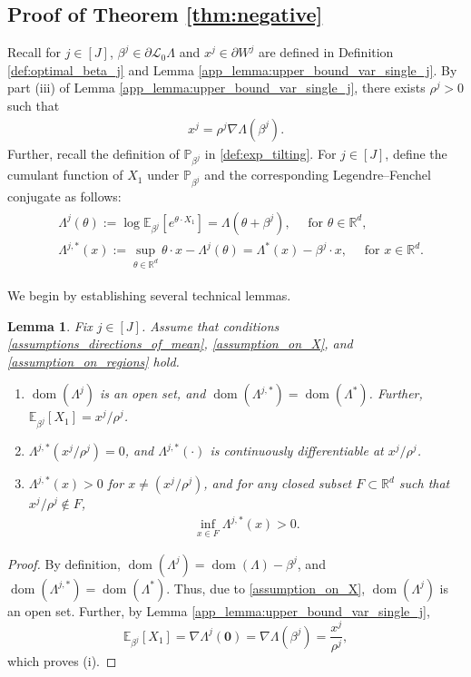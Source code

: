 \documentclass[aap,preprint]{imsart}
\newcommand{\Pro}{{\mathbb{P}}}
\newcommand{\Exp}{{\mathbb{E}}}
\newcommand{\bR}{{\mathbb{R}}}
\theoremstyle{plain}
\newtheorem{lemma}[theorem]{Lemma}
\theoremstyle{definition}
\begin{document}
\begin{appendix}
\subsection{Proof of Theorem \ref{thm:negative}}\label{app:neg_result}
Recall for $j \in [J]$, $\beta^j \in \partial \mathcal{L}_0 \Lambda$ and $x^j \in \partial W^j$ are defined in Definition \eqref{def:optimal_beta_j} and Lemma \ref{app_lemma:upper_bound_var_single_j}. By part (iii) of Lemma \ref{app_lemma:upper_bound_var_single_j}, there exists $\rho^j > 0$ such that 
\begin{align*}
    x^j = \rho^j \nabla \Lambda(\beta^j).
\end{align*}
Further, recall the definition of 
  $\Pro_{\beta^j}$ in \eqref{def:exp_tilting}. For $j \in [J]$, define the cumulant function of $X_1$ under $\Pro_{\beta^j}$ and the corresponding Legendre--Fenchel conjugate as follows:
\begin{align*}%
\begin{split}
        &\Lambda^j(\theta) := \log\Exp_{\beta^j}[e^{\theta \cdot X_1}] = \Lambda(\theta + \beta^j),\quad \text{ for } \theta \in \bR^{d}, \\
    & \Lambda^{j,*}(x) := \sup_{\theta \in \bR^{d}} \theta \cdot x - \Lambda^j(\theta) = \Lambda^*(x)- \beta^j \cdot x,\quad \text{ for } x \in \bR^d.
    \end{split}
\end{align*}
 
We begin by establishing several technical lemmas.
\begin{lemma}
    \label{app_lemma:P_beta_j}
    Fix $j \in [J]$. 
    Assume that conditions \eqref{assumptions_directions_of_mean}, \eqref{assumption_on_X}, and \eqref{assumption_on_regions} hold.  
    \begin{enumerate}[label=(\roman*)]
    \item $\operatorname{dom}(\Lambda^j)$ is an open set, and $\operatorname{dom}(\Lambda^{j,*}) = \operatorname{dom}(\Lambda^{*})$. Further, $
\Exp_{\beta^j}[X_1] =  {x^j}/{\rho^j}$.
\item $\Lambda^{j,*}\left({x^j}/{\rho^j} \right) = 0$, and $\Lambda^{j,*}(\cdot)$   is continuously differentiable at ${x^j}/{\rho^j}$. 
\item $\Lambda^{j,*}(x) > 0$ for $x \neq ({x^j}/{\rho^j})$, and for any closed subset $F \subset \bR^{d}$ such that $x^j/\rho^j \not\in F$,  
\begin{align*}
    \inf_{x \in  F} \Lambda^{j,*}(x) > 0.
\end{align*}
\end{enumerate}
\end{lemma}
\begin{proof}
By definition, $\operatorname{dom}(\Lambda^j) = \operatorname{dom}(\Lambda) - \beta^j$, and
$\operatorname{dom}(\Lambda^{j,*}) = \operatorname{dom}(\Lambda^{*})$. Thus, due to \eqref{assumption_on_X}, $\operatorname{dom}(\Lambda^j)$ is an open set. Further, by Lemma \ref{app_lemma:upper_bound_var_single_j},
    $$
\Exp_{\beta^j}[X_1] = \nabla \Lambda^j(\mathbf{0}) = \nabla \Lambda(\beta^j) = \frac{x^j}{\rho^j},
$$
which proves (i).


\end{proof}
\end{appendix}
\end{document}

